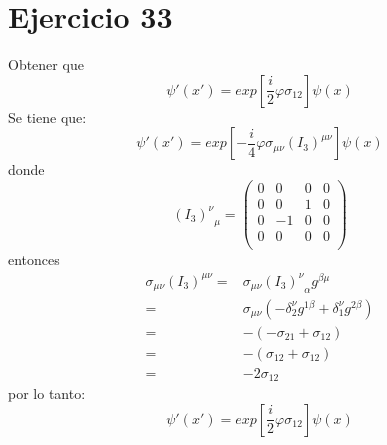 \section*{Ejercicio 33}
Obtener que 
\begin{equation*}
    {\psi}'({x}')=exp\left[\frac{i}{2}\varphi \sigma_{12} \right]\psi(x)
\end{equation*}
Se tiene que:
\begin{equation*}
    {\psi}'({x}') = exp\left[-\frac{i}{4}\varphi \sigma_{\mu\nu}\left(I_3\right)^{\mu\nu} \right] \psi(x)
\end{equation*}
donde 
\begin{equation*}
    {\left(I_3\right)^\nu}_\mu = \left(\begin{matrix}
        0 & 0 & 0 & 0 \\
        0 & 0 & 1 &0 \\ 
        0 & -1 & 0 & 0 \\
        0 & 0 & 0 & 0 \\  
    \end{matrix}\right)
\end{equation*}
entonces
\begin{align*}
    \sigma_{\mu \nu} \left(I_3\right)^{\mu\nu} =& \sigma_{\mu \nu} {\left(I_3\right)^{\nu}}_{\alpha} g^{\beta\mu }\\
    =& \sigma_{\mu \nu } \left(-\delta_{2}^{\nu}g^{1\beta} +\delta_1^\nu g^{2\beta}\right)\\
    =& - \left(-\sigma_{21}+\sigma_{12}\right)\\
    =& - \left(\sigma_{12}+\sigma_{12}\right) \\
    =& -2 \sigma_{12}
\end{align*}
por lo tanto:
\begin{equation*}
    {\psi}'({x}')=exp\left[\frac{i}{2}\varphi \sigma_{12} \right]\psi(x)
\end{equation*}